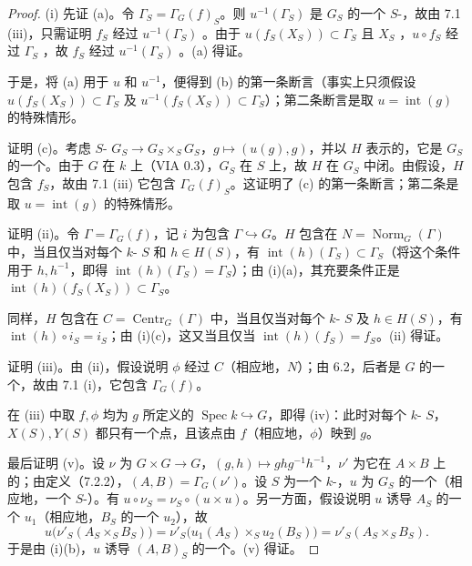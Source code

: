 \begin{proof}
(i) 先证 (a)。令 $\Gamma_S=\Gamma_G(f)_S$。则 $u^{-1}(\Gamma_S)$ 是 $G_S$ 的一个 $S$-，故由 7.1 (iii)，只需证明 $f_S$ 经过 $u^{-1}(\Gamma_S)$ 。由于 $u(f_S(X_S))\subset\Gamma_S$ 且 $X_S$ ，$u\circ f_S$ 经过 $\Gamma_S$ ，故 $f_S$ 经过 $u^{-1}(\Gamma_S)$ 。(a) 得证。

于是，将 (a) 用于 $u$ 和 $u^{-1}$，便得到 (b) 的第一条断言（事实上只须假设 $u(f_S(X_S))\subset\Gamma_S$ 及 $u^{-1}(f_S(X_S))\subset\Gamma_S$）；第二条断言是取 $u=\operatorname{int}(g)$ 的特殊情形。

证明 (c)。考虑 $S$- $G_S\to G_S\times_S G_S$，$g\mapsto(u(g),g)$，并以 $H$ 表示的，它是 $G_S$ 的一个。由于 $G$ 在 $k$ 上（VIA 0.3），$G_S$ 在 $S$ 上，故 $H$ 在 $G_S$ 中闭。由假设，$H$ 包含 $f_S$，故由 7.1 (iii) 它包含 $\Gamma_G(f)_S$。这证明了 (c) 的第一条断言；第二条是取 $u=\operatorname{int}(g)$ 的特殊情形。

证明 (ii)。令 $\Gamma=\Gamma_G(f)$，记 $i$ 为包含 $\Gamma\hookrightarrow G$。$H$ 包含在 $N=\operatorname{Norm}_G(\Gamma)$ 中，当且仅当对每个 $k$- $S$ 和 $h\in H(S)$，有 $\operatorname{int}(h)(\Gamma_S)\subset\Gamma_S$（将这个条件用于 $h,h^{-1}$，即得 $\operatorname{int}(h)(\Gamma_S)=\Gamma_S$）；由 (i)(a)，其充要条件正是 $\operatorname{int}(h)(f_S(X_S))\subset\Gamma_S$。

同样，$H$ 包含在 $C=\operatorname{Centr}_G(\Gamma)$ 中，当且仅当对每个 $k$- $S$ 及 $h\in H(S)$，有 $\operatorname{int}(h)\circ i_S=i_S$；由 (i)(c)，这又当且仅当 $\operatorname{int}(h)(f_S)=f_S$。(ii) 得证。

证明 (iii)。由 (ii)，假设说明 $\phi$ 经过 $C$（相应地，$N$）；由 6.2，后者是 $G$ 的一个，故由 7.1 (i)，它包含 $\Gamma_G(f)$。

在 (iii) 中取 $f,\phi$ 均为 $g$ 所定义的 $\operatorname{Spec}k\hookrightarrow G$，即得 (iv)：此时对每个 $k$- $S$，$X(S),Y(S)$ 都只有一个点，且该点由 $f$（相应地，$\phi$）映到 $g$。

最后证明 (v)。设 $\nu$ 为 $G\times G\to G$，$(g,h)\mapsto ghg^{-1}h^{-1}$，$\nu'$ 为它在 $A\times B$ 上的；由定义（7.2.2），$(A,B)=\Gamma_G(\nu')$。设 $S$ 为一个 $k$-，$u$ 为 $G_S$ 的一个（相应地，一个 $S$-）。有 $u\circ\nu_S=\nu_S\circ(u\times u)$。另一方面，假设说明 $u$ 诱导 $A_S$ 的一个 $u_1$（相应地，$B_S$ 的一个 $u_2$），故
\[
u\bigl(\nu'_S(A_S\times_S B_S)\bigr)
=\nu'_S\bigl(u_1(A_S)\times_S u_2(B_S)\bigr)
=\nu'_S(A_S\times_S B_S).
\]
于是由 (i)(b)，$u$ 诱导 $(A,B)_S$ 的一个。(v) 得证。
\end{proof}


